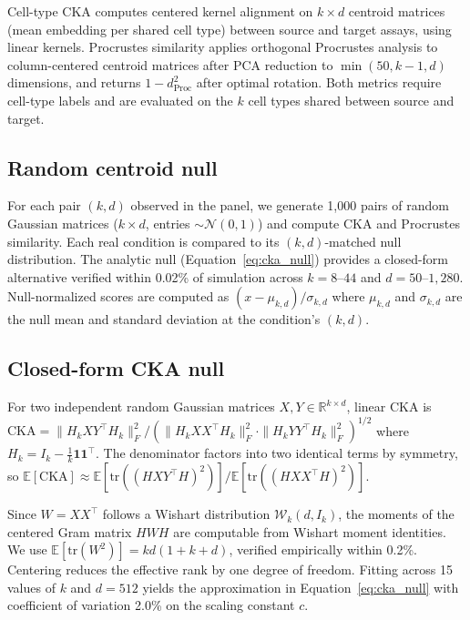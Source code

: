 \documentclass[11pt]{article}
\newcommand{\R}{\mathbb{R}}
\begin{document}
Cell-type CKA \citep{kornblith2019similarity} computes centered kernel
alignment on $k \times d$ centroid matrices (mean embedding per shared
cell type) between source and target assays, using linear kernels.
Procrustes similarity applies orthogonal Procrustes analysis to
column-centered centroid matrices after PCA reduction to $\min(50,
k-1, d)$ dimensions, and returns $1 - d_{\mathrm{Proc}}^2$ after
optimal rotation. Both metrics require cell-type labels and are
evaluated on the $k$ cell types shared between source and target.

\subsection{Random centroid null}

For each pair $(k, d)$ observed in the panel, we generate 1,000 pairs
of random Gaussian matrices ($k \times d$, entries $\sim
\mathcal{N}(0,1)$) and compute CKA and Procrustes similarity. Each real
condition is compared to its $(k, d)$-matched null distribution. The
analytic null (Equation~\ref{eq:cka_null}) provides a closed-form
alternative verified within 0.02\% of simulation across $k = 8$--$44$
and $d = 50$--$1{,}280$. Null-normalized scores are computed as
$(x - \mu_{k,d}) / \sigma_{k,d}$ where $\mu_{k,d}$ and $\sigma_{k,d}$
are the null mean and standard deviation at the condition's $(k, d)$.

\subsection{Closed-form CKA null}
\label{sec:closedform}

For two independent random Gaussian matrices $X, Y \in \R^{k \times d}$,
linear CKA is $\mathrm{CKA} = \|H_k X Y^\top H_k\|_F^2 / (\|H_k X
X^\top H_k\|_F^2 \cdot \|H_k Y Y^\top H_k\|_F^2)^{1/2}$ where
$H_k = I_k - \frac{1}{k}\mathbf{1}\mathbf{1}^\top$. The denominator
factors into two identical terms by symmetry, so
$\mathbb{E}[\mathrm{CKA}] \approx \mathbb{E}[\mathrm{tr}((HXY^\top
H)^2)] / \mathbb{E}[\mathrm{tr}((HXX^\top H)^2)]$.

Since $W = XX^\top$ follows a Wishart distribution
$\mathcal{W}_k(d, I_k)$, the moments of the centered Gram matrix $HWH$
are computable from Wishart moment identities. We use
$\mathbb{E}[\mathrm{tr}(W^2)] = kd(1 + k + d)$, verified empirically
within 0.2\%. Centering reduces the effective rank by one degree of
freedom. Fitting across 15 values of $k$ and $d = 512$ yields the
approximation in Equation~\ref{eq:cka_null} with coefficient of
variation 2.0\% on the scaling constant $c$.
\end{document}
